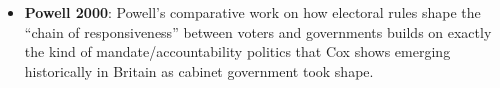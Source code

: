 \documentclass[12pt]{article}
\begin{document}
\begin{itemize}[leftmargin=*, itemsep=4pt]
    \item \textbf{Powell 2000}: Powell's comparative work on how electoral rules shape the ``chain of responsiveness'' between voters and governments builds on exactly the kind of mandate/accountability politics that Cox shows emerging historically in Britain as cabinet government took shape.
\end{itemize}
\end{document}
